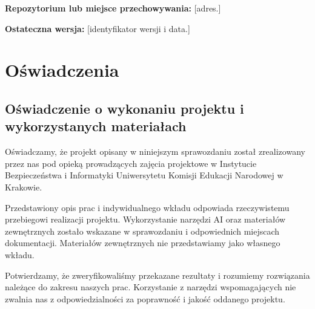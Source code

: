 \documentclass[11pt,a4paper,oneside]{article}
\newif\ifpodpowiedzi
\newcommand{\podpowiedz}[1]{\ifpodpowiedzi\par\begingroup\small\color{hintcolor}\textit{Wskazówka: #1}\par\endgroup\fi}
\newcommand{\pole}[1]{\textnormal{[#1]}}
\begin{document}
\podpowiedz{Dla projektu programistycznego podaj repozytorium i commit lub tag. Dla innych projektów podaj miejsce przechowywania i oznaczenie wersji plików. Odnośnik nie zastępuje przekazania kompletu plików do archiwizacji.}
\textbf{Repozytorium lub miejsce przechowywania:} \pole{adres.}\par
\textbf{Ostateczna wersja:} \pole{identyfikator wersji i data.}

\section{Oświadczenia}
\subsection{Oświadczenie o wykonaniu projektu i wykorzystanych materiałach}
\podpowiedz{Przed podpisaniem upewnijcie się, że treść jest zgodna z rzeczywistym przebiegiem prac i że ujawniono wykorzystanie AI oraz materiałów zewnętrznych. Oświadczenie podpisują wszyscy członkowie zespołu.}

Oświadczamy, że projekt opisany w niniejszym sprawozdaniu został zrealizowany przez nas pod opieką prowadzących zajęcia projektowe w Instytucie Bezpieczeństwa i Informatyki Uniwersytetu Komisji Edukacji Narodowej w Krakowie.

Przedstawiony opis prac i indywidualnego wkładu odpowiada rzeczywistemu przebiegowi realizacji projektu. Wykorzystanie narzędzi AI oraz materiałów zewnętrznych zostało wskazane w sprawozdaniu i odpowiednich miejscach dokumentacji. Materiałów zewnętrznych nie przedstawiamy jako własnego wkładu.

Potwierdzamy, że zweryfikowaliśmy przekazane rezultaty i rozumiemy rozwiązania należące do zakresu naszych prac. Korzystanie z narzędzi wspomagających nie zwalnia nas z odpowiedzialności za poprawność i jakość oddanego projektu.
\podpisy

\end{document}
